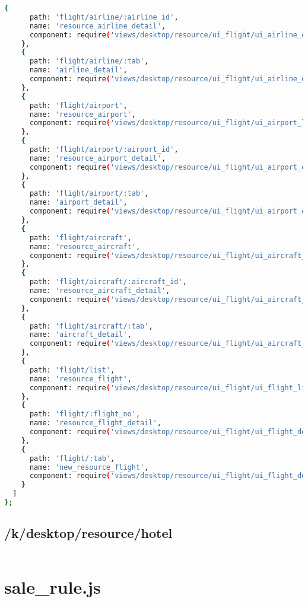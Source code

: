 \begin{lstlisting}[language=bash]
    {
      path: 'flight/airline/:airline_id',
      name: 'resource_airline_detail',
      component: require('views/desktop/resource/ui_flight/ui_airline_detail')
    },
    {
      path: 'flight/airline/:tab',
      name: 'airline_detail',
      component: require('views/desktop/resource/ui_flight/ui_airline_detail')
    },
    {
      path: 'flight/airport',
      name: 'resource_airport',
      component: require('views/desktop/resource/ui_flight/ui_airport_list')
    },
    {
      path: 'flight/airport/:airport_id',
      name: 'resource_airport_detail',
      component: require('views/desktop/resource/ui_flight/ui_airport_detail')
    },
    {
      path: 'flight/airport/:tab',
      name: 'airport_detail',
      component: require('views/desktop/resource/ui_flight/ui_airport_detail')
    },
    {
      path: 'flight/aircraft',
      name: 'resource_aircraft',
      component: require('views/desktop/resource/ui_flight/ui_aircraft_list')
    },
    {
      path: 'flight/aircraft/:aircraft_id',
      name: 'resource_aircraft_detail',
      component: require('views/desktop/resource/ui_flight/ui_aircraft_detail')
    },
    {
      path: 'flight/aircraft/:tab',
      name: 'aircraft_detail',
      component: require('views/desktop/resource/ui_flight/ui_aircraft_detail')
    },
    {
      path: 'flight/list',
      name: 'resource_flight',
      component: require('views/desktop/resource/ui_flight/ui_flight_list')
    },
    {
      path: 'flight/:flight_no',
      name: 'resource_flight_detail',
      component: require('views/desktop/resource/ui_flight/ui_flight_detail')
    },
    {
      path: 'flight/:tab',
      name: 'new_resource_flight',
      component: require('views/desktop/resource/ui_flight/ui_flight_detail')
    }
  ]
};
\end{lstlisting}



\subsection{/k/desktop/resource/hotel}


\begin{lstlisting}[language=bash]

\end{lstlisting}


\section{sale\_rule.js}




